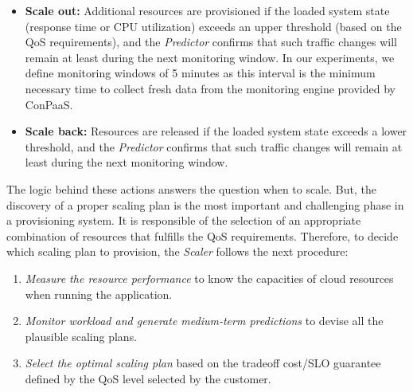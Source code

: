 \begin{itemize}

\item \textbf{Scale out:} Additional resources are provisioned if the loaded system state (response time or CPU utilization) exceeds an upper threshold (based on the QoS requirements), and the \emph{Predictor} confirms that such traffic changes will remain at least during the next monitoring window. In our experiments, we define monitoring windows of 5 minutes as this interval is the minimum necessary time to collect fresh data from the monitoring engine provided by ConPaaS. 

\item \textbf{Scale back:} Resources are released if the loaded system state exceeds a lower threshold, and the \emph{Predictor} confirms that such traffic changes will remain at least during the next monitoring window.

\end{itemize}

The logic behind these actions answers the question when to scale. But, the discovery of a proper scaling plan is the most important and challenging phase in a provisioning system. It is responsible of the selection of an appropriate combination of resources that fulfills the QoS requirements. Therefore, to decide which scaling plan to provision, the \emph{Scaler} follows the next procedure:
\begin{enumerate}
\item \emph{Measure the resource performance} to know the capacities of cloud resources when running the application.
\item \emph{Monitor workload and generate medium-term predictions} to devise all the plausible scaling plans.
\item \emph{Select the optimal scaling plan} based on the tradeoff cost/SLO guarantee defined by the QoS level selected by the customer.
\end{enumerate}


